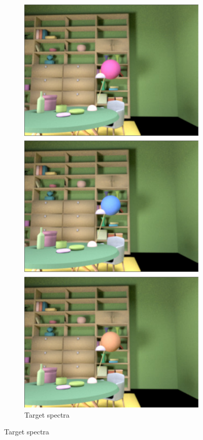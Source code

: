 \documentclass{jov}
\begin{document}
\begin{figure}
\begin{subfigure}{0.18 \textwidth}
        \label{fig:targetSizeOrientation}
    \end{subfigure}
~
\centering
	\begin{subfigure}{0.18 \textwidth}
    \centering
        \caption{Target spectra}
        \includegraphics[width=\textwidth]{../FiguresDraft5/Figure4/Figure4_c.pdf}

\end{subfigure}
\end{figure}
\end{document}
